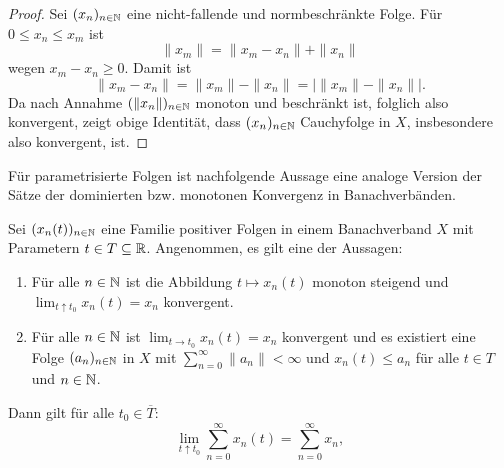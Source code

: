 \begin{proof}
Sei $(x_n)_{n\in\mathbb{N}}$ eine nicht-fallende und normbeschränkte Folge. Für $0\leq x_n\leq x_m$ ist
\begin{equation*}
\|x_m\| = \|x_m - x_n\| + \|x_n\|
\end{equation*}
wegen $x_m - x_n\geq0$. Damit ist
\begin{equation*}
\|x_m - x_n\| = \|x_m \| - \|x_n\| = \big|\|x_m\| - \|x_n\| \big |.
\end{equation*}
Da nach Annahme $(\|x_n \|)_{n\in\mathbb{N}}$ monoton und beschränkt ist, folglich also konvergent, zeigt obige Identität, dass $(x_n)_{n\in\mathbb{N}}$ Cauchyfolge in $X$, insbesondere also konvergent, ist.
\end{proof}

\par
Für parametrisierte Folgen  ist nachfolgende Aussage eine analoge Version der Sätze der dominierten bzw. monotonen Konvergenz in Banachverbänden.

\begin{fsatz}\label{Majorisierte Konvergenz in Banachverbänden}
Sei $(x_n(t))_{n\in\mathbb{N}}$ eine Familie positiver Folgen in einem Banachverband $X$ mit Parametern $t\in T\subseteq \mathbb{R}$. Angenommen, es gilt eine der Aussagen:
\begin{enumerate}
\item Für alle $n\in\mathbb{N}$ ist die Abbildung $t\mapsto x_n(t)$ monoton steigend und $\lim_{t\uparrow t_0}x_n(t) =  x_n$ konvergent.
\item Für alle $n\in\mathbb{N}$ ist $\lim_{t\to t_0} x_n(t)= x_n$ konvergent und es existiert eine Folge $(a_n)_{n\in\mathbb{N}}$ in $X$ mit $\sum_{n=0}^\infty \|a_n \|<\infty$ und $x_n(t)\leq a_n$ für alle $t\in T$ und $n\in \mathbb{N}$.
\end{enumerate}
Dann gilt für alle $t_0\in\overline T$:
\begin{equation*}
\lim_{t\uparrow t_0}\sum_{n=0}^\infty x_n(t) = \sum_{n=0}^\infty x_n,
\end{equation*}
\end{fsatz}



